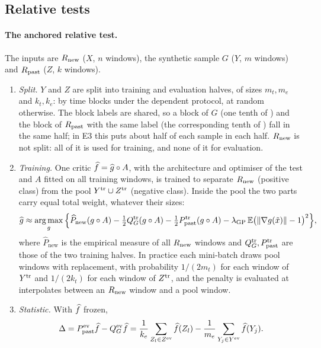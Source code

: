 \subsection{Relative tests}\label{sec:method-relative}

\paragraph{The anchored relative test.}
The inputs are $R_{\mathrm{new}}$ ($X$, $n$ windows), the synthetic sample $G$ ($Y$, $m$ windows) and
$R_{\mathrm{past}}$ ($Z$, $k$ windows).
\begin{enumerate}
  \item \emph{Split.} $Y$ and $Z$ are split into training and evaluation halves, of sizes
    $m_t,m_e$ and $k_t,k_e$: by time blocks under the dependent protocol, at random otherwise.
    The block labels are shared, so a block of $G$ (one tenth of \TEST{}) and the block of
    $R_{\mathrm{past}}$ with the same label (the corresponding tenth of \TRAIN{}) fall in the same half; in
    E3 this puts about half of each sample in each half. $R_{\mathrm{new}}$ is not split: all of it is
    used for training, and none of it for evaluation.
  \item \emph{Training.} One critic $\widehat{f}=\widehat{g}\circ A$, with the architecture and optimiser of
    the \WC{} test and $A$ fitted on all training windows, is trained to separate $R_{\mathrm{new}}$
    (positive class) from the pool $Y^{\mathrm{tr}}\cup Z^{\mathrm{tr}}$ (negative class). Inside the pool the
    two parts carry equal total weight, whatever their sizes:
    \begin{equation}\label{eq:anchored-obj}
      \widehat{g}\approx\operatorname*{arg\,max}_g\Big\{\widehat P_{\mathrm{new}}(g\circ A)
      -\tfrac12Q_{G}^{\mathrm{tr}}(g\circ A)-\tfrac12P_{\mathrm{past}}^{\mathrm{tr}}(g\circ A)
      -\lambda_{\mathrm{GP}}\,\mathbb{E}\big(\lVert\nabla g(\tilde x)\rVert-1\big)^2\Big\},
    \end{equation}
    where $\widehat P_{\mathrm{new}}$ is the empirical measure of all $R_{\mathrm{new}}$ windows and
    $Q_{G}^{\mathrm{tr}},P_{\mathrm{past}}^{\mathrm{tr}}$ are those of the two training halves. In practice each mini-batch
    draws pool windows with replacement, with probability $1/(2m_t)$ for each window of
    $Y^{\mathrm{tr}}$ and $1/(2k_t)$ for each window of $Z^{\mathrm{tr}}$, and the penalty is evaluated at
    interpolates between an $R_{\mathrm{new}}$ window and a pool window.
  \item \emph{Statistic.} With $\widehat{f}$ frozen,
    \begin{equation}\label{eq:anchored-stat}
      \Delta=P_{\mathrm{past}}^{\mathrm{ev}}\widehat{f}-Q_{G}^{\mathrm{ev}}\widehat{f}
      =\frac1{k_e}\sum_{Z_l\in Z^{\mathrm{ev}}}\widehat{f}(Z_l)-\frac1{m_e}\sum_{Y_j\in Y^{\mathrm{ev}}}\widehat{f}(Y_j).
    \end{equation}
\end{enumerate}
